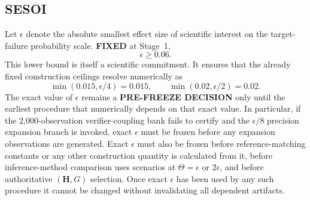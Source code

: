 \documentclass[11pt,a4paper]{article}
\newcommand{\FIXED}{\textbf{FIXED}}
\newcommand{\PFD}{\textbf{PRE-FREEZE DECISION}}
\begin{document}
\subsection{SESOI}\label{sec:sesoi}
Let $\epsilon$ denote the absolute smallest effect size of scientific interest on the target-failure probability scale. \FIXED{} at Stage~1,
\[
\epsilon\ge0.06.
\]
This lower bound is itself a scientific commitment. It ensures that the already fixed construction ceilings resolve numerically as
\[
\min(0.015,\epsilon/4)=0.015,
\qquad
\min(0.02,\epsilon/2)=0.02.
\]
The exact value of $\epsilon$ remains a \PFD{} only until the earliest procedure that numerically depends on that exact value. In particular, if the 2,000-observation verifier-coupling bank fails to certify and the $\epsilon/8$ precision expansion branch is invoked, exact $\epsilon$ must be frozen before any expansion observations are generated. Exact $\epsilon$ must also be frozen before reference-matching constants or any other construction quantity is calculated from it, before inference-method comparison uses scenarios at $\Theta=\epsilon$ or $2\epsilon$, and before authoritative $(\mathbf H,G)$ selection. Once exact $\epsilon$ has been used by any such procedure it cannot be changed without invalidating all dependent artifacts.
\end{document}
